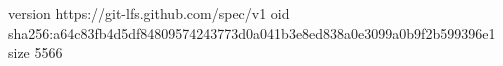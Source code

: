 version https://git-lfs.github.com/spec/v1
oid sha256:a64c83fb4d5df84809574243773d0a041b3e8ed838a0e3099a0b9f2b599396e1
size 5566
